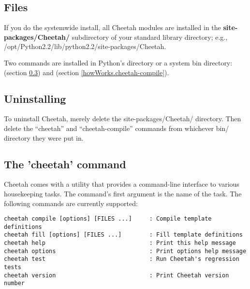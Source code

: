 \subsection{Files}
\label{gettingstarted.files}

If you do the systemwide install, all Cheetah modules are installed in the
{\bf site-packages/Cheetah/} subdirectory of your standard library
directory; e.g., /opt/Python2.2/lib/python2.2/site-packages/Cheetah.

Two commands are installed in Python's  directory or a system
bin directory:  (section \ref{gettingStarted.cheetah}) and
 (section \ref{howWorks.cheetah-compile}).  

\subsection{Uninstalling}
\label{gettingstarted.uninstalling}


To uninstall Cheetah, merely delete the site-packages/Cheetah/ directory.
Then delete the ``cheetah'' and ``cheetah-compile'' commands from whichever
bin/ directory they were put in.



\subsection{The 'cheetah' command}
\label{gettingStarted.cheetah}

Cheetah comes with a utility  that provides a command-line
interface to various housekeeping tasks.  The command's first argument is
the name of the task.  The following commands are currently supported:

\begin{verbatim}
cheetah compile [options] [FILES ...]     : Compile template definitions
cheetah fill [options] [FILES ...]        : Fill template definitions
cheetah help                              : Print this help message
cheetah options                           : Print options help message
cheetah test                              : Run Cheetah's regression tests
cheetah version                           : Print Cheetah version number
\end{verbatim}

